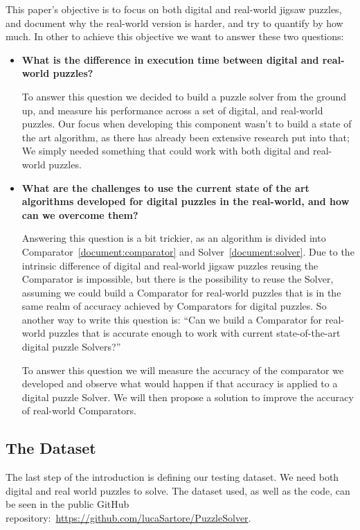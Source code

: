 \documentclass{article}
\begin{document}
This paper’s objective is to focus on both digital and real-world jigsaw puzzles,
and document why the real-world version is harder, and try to quantify by how much.
In other to achieve this objective we want to answer these two questions:
\begin{itemize}
  \item \textbf{What is the difference in execution time between
                digital and real-world puzzles?}
  
  To answer this question we decided to build a puzzle solver from the ground up,
  and measure his performance across a set of digital, and real-world puzzles.
  Our focus when developing this component wasn't to build a state of the art algorithm,
  as there has already been extensive research put into that;
  We simply needed something that could work with both digital and real-world puzzles.
  
  \item \textbf{What are the challenges to use the current state of the art algorithms developed for digital
                puzzles in the real-world, and how can we overcome them?}
  
	Answering this question is a bit trickier, as an algorithm is divided into Comparator~\cref{document:comparator}
  and Solver~\cref{document:solver}. Due to the intrinsic difference of digital and real-world jigsaw puzzles
  reusing the Comparator is impossible, but there is the possibility to reuse the Solver,
  assuming we could build a Comparator for real-world puzzles that is in the same realm
  of accuracy achieved by Comparators for digital puzzles.
  So another way to write this question is: ``Can we build a Comparator for real-world
  puzzles that is accurate enough to work with current state-of-the-art  digital
  puzzle Solvers?''

	To answer this question we will measure the accuracy of the comparator we developed
  and observe what would happen if that accuracy is
  applied to a digital puzzle Solver. We will then propose a solution to improve
  the accuracy of real-world Comparators.


\end{itemize}

\subsection{The Dataset}
The last step of the introduction is defining our
testing dataset. We need both digital and real world
puzzles to solve. The dataset used, as well as
the code, can be seen in the public GitHub
repository:~\url{https://github.com/lucaSartore/PuzzleSolver}.
\label{document:dataset}
\end{document}
